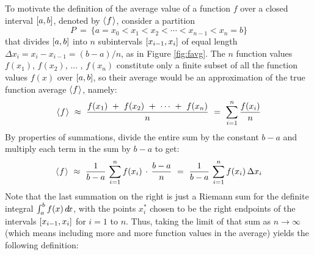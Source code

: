 To motivate the definition of the average value of a function $f$ over a closed
interval $\lbrack a,b \rbrack$, denoted by $\langle\mspace{1mu}f\mspace{1mu}\rangle$, consider a partition
\[
P ~=~ \lbrace a = x_0 < x_1 < x_2 < \cdots < x_{n-1} < x_n = b \rbrace
\]
that divides $\lbrack a,b \rbrack$ into $n$ subintervals
$\lbrack x_{i-1},x_i \rbrack$ of equal length $\Delta x_i = x_i-x_{i-1} = (b-a)/n$,
as in Figure \ref{fig:favg}. The $n$ function values $f(x_1)$, $f(x_2)$,
$\ldots$ , $f(x_n)$ constitute only a finite subset of all the function
values $f(x)$ over $\lbrack a,b \rbrack$, so their average would be an
approximation of the true function average $\langle\mspace{1mu}f\mspace{1mu}\rangle$, namely:
\[
\langle\mspace{1mu}f\mspace{1mu}\rangle ~\approx~ \frac{f(x_1) ~+~ f(x_2) ~+~ \cdots ~+~ f(x_n)}{n} ~=~
 \sum_{i=1}^n \frac{f(x_i)}{n}
\]
By properties of summations, divide the entire sum by the constant $b-a$ 
and multiply each term in the sum by $b-a$ to get:
\newpage
\[
\langle\mspace{1mu}f\mspace{1mu}\rangle ~\approx~ \frac{1}{b-a}\,\sum_{i=1}^n f(x_i)\,\cdot\,\frac{b-a}{n} ~=~
\frac{1}{b-a}\,\sum_{i=1}^n f(x_i)\,\Delta x_i
\]
Note that the last summation on the right is just a Riemann sum for the
definite integral $\int_a^b f(x)\,d\!x$, with the points $x_i^*$ chosen to be the
right endpoints of the intervals $\lbrack x_{i-1},x_i \rbrack$ for $i=1$ to $n$. Thus,
taking the limit of that sum as $n \to \infty$ (which means including more and
more function values in the average) yields the following definition:

